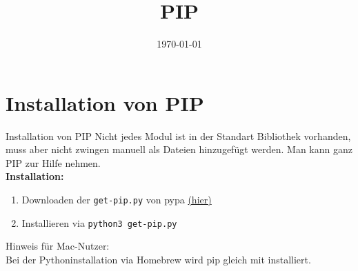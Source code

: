 


\newcommand{\topic}{
	PIP
}

\title{\topic}
\supertitle{\course}
\date{\today}



\maketitle

\begin{frame}
	\tableofcontents
\end{frame}




\section{Installation von PIP}
\begin{frame}{Installation von PIP}
	Nicht jedes Modul ist in der Standart Bibliothek vorhanden, muss aber nicht zwingen manuell als Dateien hinzugefügt werden. Man kann ganz PIP zur Hilfe nehmen.\\[.5cm]
	\textbf{Installation:}\\
	\begin{enumerate}
		\item Downloaden der \texttt{get-pip.py} von pypa \href{https://bootstrap.pypa.io/get-pip.py}{(hier)}
		\item Installieren via \texttt{python3 get-pip.py}\\[.5cm]
	\end{enumerate}
	
	Hinweis für Mac-Nutzer:\\
	Bei der Pythoninstallation via Homebrew wird pip gleich mit installiert.
\end{frame}

